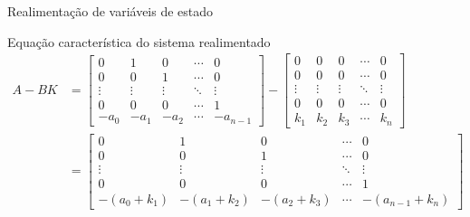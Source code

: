 \begin{frame}{Realimentação de variáveis de estado}
\begin{block}{Equação característica do sistema realimentado}
\vspace{0.3cm}
\begin{align*}
    A - BK &= \begin{bmatrix}
    0 & 1 & 0 & \cdots & 0 \\
    0 & 0 & 1 & \cdots & 0 \\
    \vdots & \vdots & \vdots & \ddots & \vdots \\
    0 & 0 & 0 & \cdots & 1 \\
    -a_0 & -a_1 & -a_2 & \cdots & -a_{n-1}
    \end{bmatrix} - \begin{bmatrix}
    0 & 0 & 0 & \cdots & 0 \\
    0 & 0 & 0 & \cdots & 0 \\
    \vdots & \vdots & \vdots & \ddots & \vdots \\
    0 & 0 & 0 & \cdots & 0 \\
    k_1 & k_2 & k_3 & \cdots & k_n
    \end{bmatrix} \\
    &= \begin{bmatrix}
    0 & 1 & 0 & \cdots & 0 \\
    0 & 0 & 1 & \cdots & 0 \\
    \vdots & \vdots & \vdots & \ddots & \vdots \\
    0 & 0 & 0 & \cdots & 1 \\
    -(a_0+k_1) & -(a_1+k_2) & -(a_2+k_3) & \cdots & -(a_{n-1}+k_n)
    \end{bmatrix}
\end{align*}
\end{block}
\end{frame}

